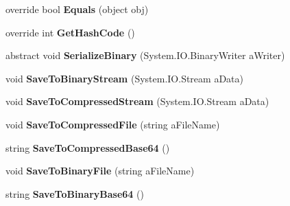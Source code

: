 \begin{DoxyCompactItemize}
\item 
override bool {\bfseries Equals} (object obj)\hypertarget{classSimpleJSON_1_1JSONNode_a6748a3e48c993f7904cfb70a047fb18b}{}\label{classSimpleJSON_1_1JSONNode_a6748a3e48c993f7904cfb70a047fb18b}

\item 
override int {\bfseries Get\+Hash\+Code} ()\hypertarget{classSimpleJSON_1_1JSONNode_a97a4e4d2618feba0493ea30e1ea7f74b}{}\label{classSimpleJSON_1_1JSONNode_a97a4e4d2618feba0493ea30e1ea7f74b}

\item 
abstract void {\bfseries Serialize\+Binary} (System.\+I\+O.\+Binary\+Writer a\+Writer)\hypertarget{classSimpleJSON_1_1JSONNode_a27b2c314ae56defbef0f0af461bd71be}{}\label{classSimpleJSON_1_1JSONNode_a27b2c314ae56defbef0f0af461bd71be}

\item 
void {\bfseries Save\+To\+Binary\+Stream} (System.\+I\+O.\+Stream a\+Data)\hypertarget{classSimpleJSON_1_1JSONNode_ad03877d6d86750e9da28e5a09d05f17e}{}\label{classSimpleJSON_1_1JSONNode_ad03877d6d86750e9da28e5a09d05f17e}

\item 
void {\bfseries Save\+To\+Compressed\+Stream} (System.\+I\+O.\+Stream a\+Data)\hypertarget{classSimpleJSON_1_1JSONNode_a695ad84343c455c9e51e829b09b6383f}{}\label{classSimpleJSON_1_1JSONNode_a695ad84343c455c9e51e829b09b6383f}

\item 
void {\bfseries Save\+To\+Compressed\+File} (string a\+File\+Name)\hypertarget{classSimpleJSON_1_1JSONNode_a758ce7b14ca3c2055f46bd47ef9ca22d}{}\label{classSimpleJSON_1_1JSONNode_a758ce7b14ca3c2055f46bd47ef9ca22d}

\item 
string {\bfseries Save\+To\+Compressed\+Base64} ()\hypertarget{classSimpleJSON_1_1JSONNode_ac045f8735648431c1209c7a25ca0beb9}{}\label{classSimpleJSON_1_1JSONNode_ac045f8735648431c1209c7a25ca0beb9}

\item 
void {\bfseries Save\+To\+Binary\+File} (string a\+File\+Name)\hypertarget{classSimpleJSON_1_1JSONNode_ade700e4dde694066e8cecc3a941b4c02}{}\label{classSimpleJSON_1_1JSONNode_ade700e4dde694066e8cecc3a941b4c02}

\item 
string {\bfseries Save\+To\+Binary\+Base64} ()\hypertarget{classSimpleJSON_1_1JSONNode_aa4555b318d8f828304a93c4a2e7d5007}{}\label{classSimpleJSON_1_1JSONNode_aa4555b318d8f828304a93c4a2e7d5007}


\end{DoxyCompactItemize}
